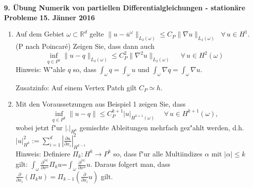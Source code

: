 \documentclass[11pt,a4paper]{report}
\begin{document}
\begin{center}
\textbf{9. \"Ubung Numerik von partiellen Differentialgleichungen - station\"are Probleme} \newline 
\textbf{15. J\"anner 2016}
\end{center}

\begin{enumerate}


\item Auf dem Gebiet $\omega \subset \mathbb{R}^d$ gelte 
  $\|u-\overline{u}^\omega\|_{L_2(\omega)} \leq C_P \|\nabla u \|
  _{L_2(\omega)}\;\;\forall\, u \in H^1$.  (P nach Poincar\'e)
Zeigen Sie, dass dann auch 
$$\inf\limits_{q\in P^1} \|u-q \|_{L_2(\omega)} \leq C_P^2 \|\nabla^2
u \|_{L_2(\omega)} \;\quad \forall\, u \in H^2(\omega)$$
Hinweis: W"ahle $q$ so, dass $\int_\omega q = \int_\omega u$ und
$\int_\omega \nabla q = \int_\omega \nabla u$.

Zusatzinfo: Auf einem Vertex Patch gilt $C_P \simeq h$.
\vspace{10pt}

\item Mit den Voraussetzungen aus Beispiel 1 zeigen Sie, dass
$$\inf\limits_{q\in P^k} \|u-q \| \leq C_P^{k+1} | u |_{H^{k+1}(\omega)}\;\quad \forall\, u\in H^{k+1}(\omega), $$
wobei jetzt f"ur $| .  |_{H^k}$ gemischte Ableitungen mehrfach gez"ahlt werden, d.h. $|u|^2_{H^k}:=\sum\limits_{i=1}^d |\frac{\partial u}{\partial x_i}|^2_{H^{k-1}}$ \\
Hinweis: Definiere $\Pi_k: H^k\rightarrow P^k$ so, dass f"ur alle Multiindizes $\alpha$ mit $|\alpha|\leq k$ gilt: $\int_\omega \frac{\partial^{|\alpha|}}{\partial x^{\alpha}}\Pi_ku$=$\int_\omega \frac{\partial^{|\alpha|}}{\partial x^{\alpha}}u$. Daraus folgert man, dass $\frac{\partial}{\partial x_i}(\Pi_ku) = \Pi_{k-1}(\frac{\partial}{\partial x_i}u)$ gilt.
\vspace{10pt}


\end{enumerate}
\end{document}
